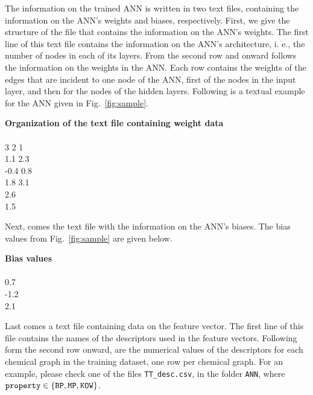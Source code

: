\documentclass[11pt, titlepage, dvipdfmx, twoside]{article}
\begin{document}
The information on the trained ANN is written in two text files, containing the information
on the ANN's weights and biases, respectively.
First, we give the structure of the file that contains the information on the ANN's weights.
The first line of this text file contains the information on the ANN's architecture, i. e., 
the number of nodes in each of its layers.
From the second row and onward
follows the information on the 
weights in the ANN.
Each row contains the weights of the edges that are incident to one node of the ANN,
first of the nodes in the input layer, and then for the nodes of the hidden layers.
Following is a textual example for the ANN given in Fig.~\ref{fig:sample}.

\bigskip

\begin{oframed}
{\bf Organization of the text file containing weight data}\\\\
3 2 1\\
1.1 2.3\\
-0.4 0.8\\
1.8 3.1\\
2.6\\
1.5\\
\end{oframed}

\bigskip


Next, comes the text file with the information on the ANN's biases.
The bias values from Fig.~\ref{fig:sample} are given below.

\bigskip

\begin{oframed}
{\bf Bias values}\\\\
0.7\\
-1.2\\
2.1\\
\end{oframed}

\bigskip

Last comes a text file containing data on the feature vector.
The first line of this file contains the names of the descriptors used in the feature vectors.
Following form the second row onward, are the numerical values of the descriptors for each chemical graph
in the training dataset, one row per chemical graph.
For an example, please check one of the files  {\tt TT\_desc.csv},  in the folder {\tt ANN},
where ${\tt property} \in \{{\tt BP, MP, KOW}\}$.
\end{document}

